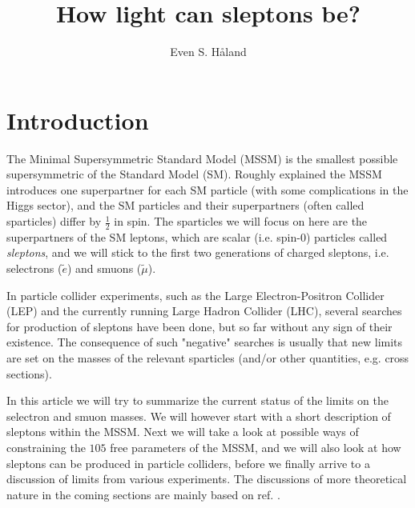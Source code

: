 \documentclass[twocolumn,a4paper,10pt]{article}
\author{Even S. Håland}
\title{How light can sleptons be?}
\begin{document}

\section{Introduction}

The Minimal Supersymmetric Standard Model (MSSM) is the smallest possible supersymmetric 
of the Standard Model (SM). Roughly explained the MSSM introduces one superpartner for each 
SM particle (with some complications in the Higgs sector), and the SM particles and their 
superpartners (often called sparticles) differ by $\frac{1}{2}$ in spin. 
The sparticles we will focus on here are the superpartners of the SM leptons, which are scalar (i.e. 
spin-$0$) particles called \textit{sleptons}, and we will stick to the first two generations of 
charged sleptons, i.e. selectrons ($\tilde{e}$) and smuons ($\tilde{\mu}$).  

In particle collider experiments, such as the Large Electron-Positron Collider (LEP) and the currently 
running Large Hadron Collider (LHC), several searches for production of sleptons have been done, but 
so far without any sign of their existence. The consequence of such "negative" searches is usually 
that new limits are set on the masses of the relevant sparticles (and/or other quantities, e.g. 
cross sections).              

In this article we will try to summarize the current status of the limits on the selectron and smuon 
masses. We will however start with a short description of sleptons within the MSSM. Next we will take 
a look at possible ways of constraining the $105$ free parameters of the MSSM, and we will also look at 
how sleptons can be produced in particle colliders, before we finally arrive to a discussion of limits 
from various experiments. The discussions of more theoretical nature in the coming sections are mainly 
based on ref. \cite{Lecture notes}.             
\end{document}
